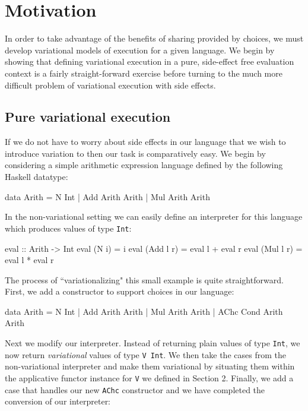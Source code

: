 \documentclass[letterpaper,10pt,onecolumn]{article}
\newcommand{\prog}[1]{{\small\texttt{#1}}}
\begin{document}
\section{Motivation}

In order to take advantage of the benefits of sharing provided by choices, we must develop variational
models of execution for a given language. We begin by showing that defining variational execution in a pure,
side-effect free evaluation context is a fairly straight-forward exercise before turning to the much more
difficult problem of variational execution with side effects.

\subsection{Pure variational execution}

If we do not have to worry about side effects in our language that we wish to introduce variation to then
our task is comparatively easy. We begin by considering a simple arithmetic expression language
defined by the following Haskell datatype:

\begin{program}
data Arith = N Int | Add Arith Arith | Mul Arith Arith
\end{program}

In the non-variational setting we can easily define an interpreter for this language which produces
values of type \prog{Int}:

\begin{program}
eval :: Arith -> Int
eval (N i) = i
eval (Add l r) = eval l + eval r
eval (Mul l r) = eval l * eval r
\end{program}

The process of ``variationalizing" this small example is quite straightforward. First, we add a
constructor to support choices in our language:

\begin{program}
data Arith = N Int | Add Arith Arith | Mul Arith Arith | AChc Cond Arith Arith
\end{program}

Next we modify our interpreter. Instead of returning plain values of type \prog{Int},
we now return \emph{variational} values of type \prog{V Int}. We then take the cases
from the non-variational interpreter and make them variational by situating them within the
applicative functor instance for \prog{V} we defined in Section 2. Finally, we add a case
that handles our new \prog{AChc} constructor and we have completed the conversion of our
interpreter:
\end{document}
